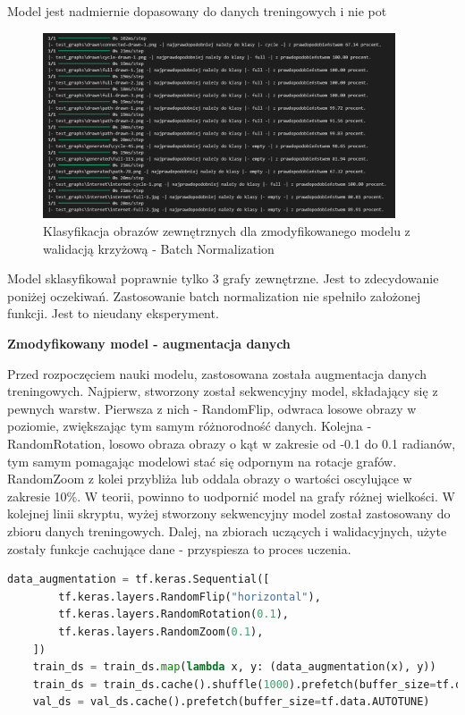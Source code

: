 Model jest nadmiernie dopasowany do danych treningowych i nie pot

\begin{figure}[ht]
	\centering
	\includegraphics[height=5.5cm]{resources/tests/images/v4/crossvalid_2_txt.png}
	\caption{Klasyfikacja obrazów zewnętrznych dla zmodyfikowanego modelu z walidacją krzyżową - Batch Normalization}
	\label{Fig:tests-cv-2b}
\end{figure}
\FloatBarrier

Model sklasyfikował poprawnie tylko 3 grafy zewnętrzne. Jest to zdecydowanie poniżej oczekiwań.
Zastosowanie batch normalization nie spełniło założonej funkcji. Jest to nieudany eksperyment.

\textbf{Zmodyfikowany model - augmentacja danych}

Przed rozpoczęciem nauki modelu, zastosowana została augmentacja danych treningowych.
Najpierw, stworzony został sekwencyjny model, składający się z pewnych warstw.
Pierwsza z nich - RandomFlip, odwraca losowe obrazy w poziomie, zwiększając tym samym różnorodność danych.
Kolejna - RandomRotation, losowo obraza obrazy o kąt w zakresie od -0.1 do 0.1 radianów,
tym samym pomagając modelowi stać się odpornym na rotacje grafów.
RandomZoom z kolei przybliża lub oddala obrazy o wartości oscylujące w zakresie 10\%.
W teorii, powinno to uodpornić model na grafy różnej wielkości.
W kolejnej linii skryptu, wyżej stworzony sekwencyjny model został zastosowany do zbioru danych treningowych.
Dalej, na zbiorach uczących i walidacyjnych, użyte zostały funkcje cachujące dane - przyspiesza to proces uczenia.

\begin{lstlisting}[language=Python,caption=Listing zmodyfikowanego skryptu poprzedzającego tworzenie modelu z walidacją krzyżową
	- wersja 3,label={tests-model-crossval3}]
	data_augmentation = tf.keras.Sequential([
        tf.keras.layers.RandomFlip("horizontal"),
        tf.keras.layers.RandomRotation(0.1),
        tf.keras.layers.RandomZoom(0.1),
    ])
    train_ds = train_ds.map(lambda x, y: (data_augmentation(x), y))
    train_ds = train_ds.cache().shuffle(1000).prefetch(buffer_size=tf.data.AUTOTUNE)
    val_ds = val_ds.cache().prefetch(buffer_size=tf.data.AUTOTUNE)
\end{lstlisting}

